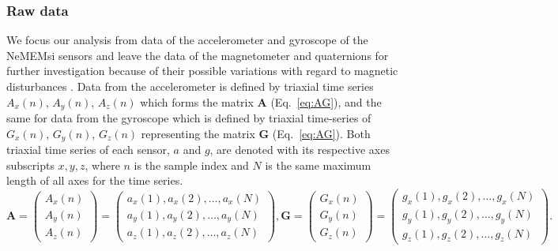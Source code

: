 \documentclass[fleqn,10pt]{wlscirep}
\begin{document}
\subsubsection*{Raw data}
We focus our analysis from data of the accelerometer and gyroscope of the NeMEMsi sensors \cite{Comotti2014} and leave the data of the magnetometer and quaternions for further investigation because of their possible variations with regard to magnetic disturbances \cite{shoaib2016}.
Data from the accelerometer is defined by triaxial time series $A_x(n)$, $A_y(n)$, $A_z(n)$ which forms the matrix $\boldsymbol{A}$ (Eq.~\ref{eq:AG}), and the same for data from the gyroscope which is defined by triaxial time-series of $G_x(n)$, $G_y(n)$, $G_z(n)$ representing the matrix $\boldsymbol{G}$ (Eq.~\ref{eq:AG}).
Both triaxial time series of each sensor, $a$ and $g$, are denoted with its respective axes subscripts $x,y,z$, where $n$ is the sample index and $N$ is the same maximum length of all axes for the time series.
\begin{equation}\label{eq:AG}
\boldsymbol{A} =
\begin{pmatrix}
  A_x(n) \\
  A_y(n) \\
  A_z(n)
\end{pmatrix}
=
\begin{pmatrix}
 a_x(1),a_x(2),\dots,a_x(N) \\
 a_y(1),a_y(2),\dots,a_y(N) \\
 a_z(1),a_z(2),\dots,a_z(N) 
\end{pmatrix},
\boldsymbol{G} =
\begin{pmatrix}
 G_x(n) \\
 G_y(n) \\
 G_z(n)
\end{pmatrix}
=
\begin{pmatrix}
 g_x(1),g_x(2),\dots,g_x(N) \\
 g_y(1),g_y(2),\dots,g_y(N) \\
 g_z(1),g_z(2),\dots,g_z(N) 
\end{pmatrix}.
\end{equation}
\end{document}
